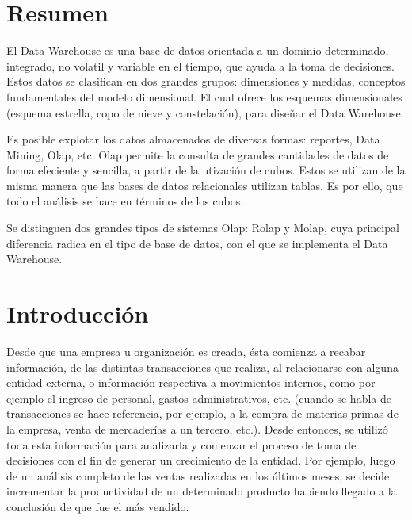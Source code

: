 \documentclass[a4paper,11pt]{article}
\begin{document}
    \section{Resumen}
  
    El Data Warehouse es una base de datos orientada a un dominio determinado, integrado, no volatil y variable en el tiempo, que ayuda a la toma de decisiones.
    Estos datos se clasifican en dos grandes grupos: dimensiones y medidas, conceptos fundamentales del modelo dimensional. El cual ofrece los esquemas dimensionales
    (esquema estrella, copo de nieve y constelación), para diseñar el Data Warehouse.
    
    Es posible explotar los datos almacenados de diversas formas:
    reportes, Data Mining, Olap, etc. Olap permite la consulta de grandes cantidades de datos de forma efeciente y sencilla, a partir de la utización de cubos.
    Estos se utilizan de la misma manera que las bases de datos relacionales utilizan tablas.
    Es por ello, que todo el análisis se hace en términos de los cubos.
    
    Se distinguen dos grandes tipos de sistemas Olap: Rolap y Molap, cuya principal diferencia radica en el tipo de base de datos, con el que se implementa el
    Data Warehouse.


  
  \newpage\null\thispagestyle{empty}\newpage
  \maketitle
  \tableofcontents
  \newpage
  

  
  
    \section{Introducción}

    Desde que una empresa u organización es creada, ésta comienza a recabar información, de las distintas transacciones que realiza, al relacionarse
    con alguna entidad externa, o información respectiva a movimientos internos, como por ejemplo el ingreso de personal, gastos administrativos,
    etc. (cuando se habla de transacciones se hace referencia, por ejemplo, a la compra de materias primas de la empresa, venta de mercaderías a un tercero,
    etc.). Desde entonces, se utilizó toda esta información para analizarla y comenzar el proceso de toma de decisiones con el fin de generar un
    crecimiento de la entidad. Por ejemplo, luego de un análisis completo de las ventas realizadas en los últimos meses, se decide incrementar la 
    productividad de un determinado producto habiendo llegado a la conclusión de que fue el más vendido.
    
\end{document}
